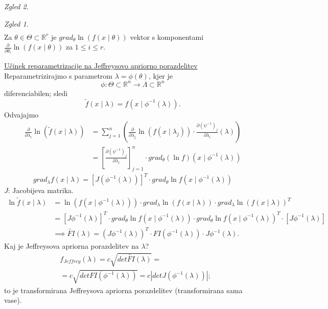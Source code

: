 \documentclass[a4paper, 12pt]{book}
\theoremstyle{definition}
\theoremstyle{remark}
\newtheorem*{exmp}{Zgled}
\newcommand{\R}{\mathbb{R}}
\begin{document}
\begin{exmp}
\begin{exmp}
\begin{align*}
    \end{align*}
    Za $\theta \in \Theta \subset \R^r$ je $grad_{\theta} \ln (f(x \mid \theta))$ vektor s komponentami
    $\frac{\partial}{\partial \theta_i} \ln(f(x \mid \theta))$ za $1 \leq i \leq r$.
  \end{exmp}
  \underline{Učinek reparametrizacije na Jeffreysovo apriorno porazdelitev} \\
  Reparametrizirajmo s parametrom $\lambda = \phi(\theta)$, kjer je
  \begin{equation*}
    \phi: \Theta \subset \R^n \to \Lambda \subset \R^n
  \end{equation*}
  diferenciabilen; sledi
  \begin{equation*}
    \widetilde{f}(x \mid \lambda) = f(x \mid \phi^{-1}(\lambda)).
  \end{equation*}
  Odvajajmo
  \begin{align*}
    \frac{\partial}{\partial \lambda_i} \ln(\widetilde{f}(x \mid \lambda)) &=
      \sum_{j=1}^{n} (\frac{\partial}{\partial \lambda_j} \ln(f(x \mid \lambda_j)) \cdot
        \frac{\partial (\psi^{-1})_j}{\partial \lambda_i} (\lambda)) \\
    &= \left[\frac{\partial (\psi^{-1})_j}{\partial \lambda_i}\right]_{j=1}^n
      \cdot grad_{\theta} (\ln f) (x \mid \phi^{-1}(\lambda))
  \end{align*}
  \begin{equation*}
    grad_{\lambda} f(x \mid \lambda) = [J(\phi^{-1}(\lambda))]^T \cdot grad_{\theta} \ln f (x \mid \phi^{-1}(\lambda))
  \end{equation*}
  $J$: Jacobijeva matrika.
  \begin{align*}
    \ln \widetilde{f}(x \mid \lambda) &= \ln(f(x \mid \phi^{-1}(\lambda))) \cdot
      grad_{\lambda} \ln(f(x \mid \lambda)) \cdot grad_{\lambda} \ln(f(x \mid \lambda))^T \\
    &= [J \phi^{-1}(\lambda)]^T \cdot grad_{\theta} \ln f (x \mid \phi^{-1}(\lambda)) \cdot
      grad_{\theta} \ln f (x \mid \phi^{-1}(\lambda))^T \cdot [J \phi^{-1}(\lambda)] \\
    &\implies \widetilde{FI}(\lambda) = (J \phi^{-1}(\lambda))^T \cdot
      FI(\phi^{-1}(\lambda)) \cdot J \phi^{-1}(\lambda).      
  \end{align*}
  Kaj je Jeffreysova apriorna porazdelitev na $\lambda$?
  \begin{align*}
    &f_{Jeffrey}(\lambda) = c \sqrt{det \widetilde{FI}(\lambda)} = \\
    &= c \sqrt{det FI (\phi^{-1}(\lambda))} = c |det J(\phi^{-1}(\lambda))|;
  \end{align*}
  to je transformirana Jeffreysova apriorna porazdelitev (transformirana sama vase).
\end{exmp}
\end{document}
